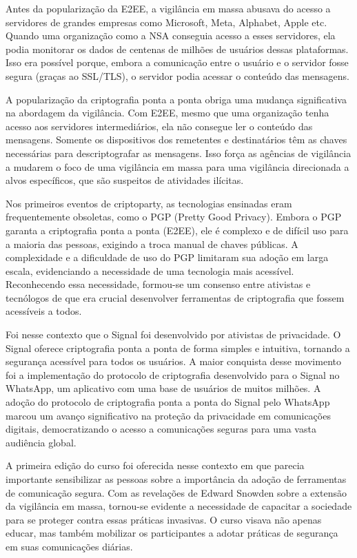 Antes da popularização da E2EE, a vigilância em massa abusava do acesso a servidores de grandes empresas como Microsoft, Meta, Alphabet, Apple etc.
Quando uma organização como a NSA conseguia acesso a esses servidores, ela podia monitorar os dados de centenas de milhões de usuários dessas plataformas.
Isso era possível porque, embora a comunicação entre o usuário e o servidor fosse segura (graças ao SSL/TLS), o servidor podia acessar o conteúdo das mensagens.

A popularização da criptografia ponta a ponta obriga uma mudança significativa na abordagem da vigilância.
Com E2EE, mesmo que uma organização tenha acesso aos servidores intermediários, ela não consegue ler o conteúdo das mensagens.
Somente os dispositivos dos remetentes e destinatários têm as chaves necessárias para descriptografar as mensagens.
Isso força as agências de vigilância a mudarem o foco de uma vigilância em massa para uma vigilância direcionada a alvos específicos, que são suspeitos de atividades ilícitas.

Nos primeiros eventos de criptoparty, as tecnologias ensinadas eram frequentemente obsoletas, como o PGP (Pretty Good Privacy).
Embora o PGP garanta a criptografia ponta a ponta (E2EE), ele é complexo e de difícil uso para a maioria das pessoas, exigindo a troca manual de chaves públicas.
A complexidade e a dificuldade de uso do PGP limitaram sua adoção em larga escala, evidenciando a necessidade de uma tecnologia mais acessível.
Reconhecendo essa necessidade, formou-se um consenso entre ativistas e tecnólogos de que era crucial desenvolver ferramentas de criptografia que fossem acessíveis a todos.

Foi nesse contexto que o Signal foi desenvolvido por ativistas de privacidade.
O Signal oferece criptografia ponta a ponta de forma simples e intuitiva, tornando a segurança acessível para todos os usuários.
A maior conquista desse movimento foi a implementação do protocolo de criptografia desenvolvido para o Signal no WhatsApp, um aplicativo com uma base de usuários de muitos milhões.
A adoção do protocolo de criptografia ponta a ponta do Signal pelo WhatsApp marcou um avanço significativo na proteção da privacidade em comunicações digitais, democratizando o acesso a comunicações seguras para uma vasta audiência global.

A primeira edição do curso foi oferecida nesse contexto em que parecia importante sensibilizar as pessoas sobre a importância da adoção de ferramentas de comunicação segura.
Com as revelações de Edward Snowden sobre a extensão da vigilância em massa, tornou-se evidente a necessidade de capacitar a sociedade para se proteger contra essas práticas invasivas.
O curso visava não apenas educar, mas também mobilizar os participantes a adotar práticas de segurança em suas comunicações diárias.

